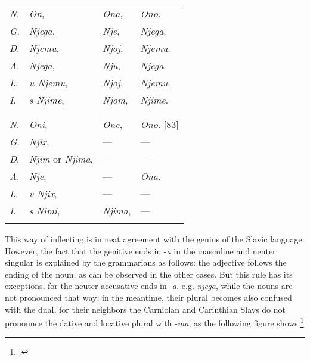 \begin{longtable}{ l l l l }
    \lsptoprule
    \multicolumn{4}{ c }{Singular.} \\
    \midrule
    \textit{N}. & \textit{On}, & \textit{Ona}, & \textit{Ono}. \\
    \textit{G}. & \textit{Njega}, & \textit{Nje}, & \textit{Njega}. \\
    \textit{D}. & \textit{Njemu}, & \textit{Njoj}, & \textit{Njemu}. \\
    \textit{A}. & \textit{Njega}, & \textit{Nju}, & \textit{Njega}. \\
    \textit{L}. & \textit{u Njemu}, & \textit{Njoj}, & \textit{Njemu}. \\
    \textit{I}. & \textit{s Njime}, & \textit{Njom}, & \textit{Njime}. \\
    \lspbottomrule
    \\
    \lsptoprule
    \multicolumn{4}{ c }{Plural.} \\
    \midrule
    \textit{N}. & \textit{Oni}, & \textit{One}, & \textit{Ono}. [83] \\
    \textit{G}. & \textit{Njix}, & — & — \\
    \textit{D}. & \textit{Njim } or \textit{Njima}, & — & — \\
    \textit{A}. & \textit{Nje}, & — & \textit{Ona}. \\
    \textit{L}. & \textit{v Njix}, & — & — \\
    \textit{I}. & \textit{s Nimi}, & \textit{Njima}, & — \\
    \lspbottomrule
\end{longtable}

This way of inflecting is in neat agreement with the genius of the Slavic language. However, the fact that the genitive ends in -\textit{a} in the masculine and neuter singular is explained by the grammarians as follows: the adjective follows the ending of the noun, as can be observed in the other cases. But this rule has its exceptions, for the neuter accusative ends in -\textit{a}, e.g. \textit{njega}, while the nouns are not pronounced that way; in the meantime, their plural becomes also confused with the dual, for their neighbors the Carniolan and Carinthian Slavs do not pronounce the dative and locative plural with -\textit{ma}, as the following figure shows:\footnote{\citet[281]{kopitar_grammatik_1808}.}

\enlargethispage{1mm}

